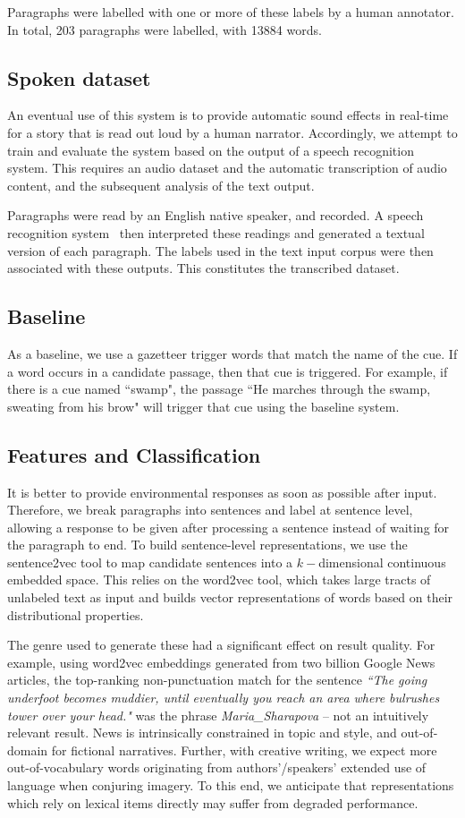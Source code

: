 \documentclass[10pt,a4paper]{article}
\begin{document}
Paragraphs were labelled with one or more of these labels by a human annotator.
In total, 203 paragraphs were labelled, with 13884 words.

\subsection{Spoken dataset}
An eventual use of this system is to provide automatic sound effects in real-time for a story that is read out loud by a human narrator.
Accordingly, we attempt to train and evaluate the system based on the output of a speech recognition system.
This requires an audio dataset and the automatic transcription of audio content, and the subsequent analysis of the text output.

Paragraphs were read by an English native speaker, and recorded.
A speech recognition system~\cite{lamere2003design} then interpreted these readings and generated a textual version of each paragraph.
The labels used in the text input corpus were then associated with these outputs.
This constitutes the transcribed dataset.

\subsection{Baseline}
As a baseline, we use a gazetteer trigger words that match the name of the cue.
If a word occurs in a candidate passage, then that cue is triggered.
For example, if there is a cue named ``swamp", the passage ``He marches through the swamp, sweating from his brow" will trigger that cue using the baseline system.

\subsection{Features and Classification}

It is better to provide environmental responses as soon as possible after input.
Therefore, we break paragraphs into sentences and label at sentence level, allowing a response to be given after processing a sentence instead of waiting for the paragraph to end.
To build sentence-level representations, we use the sentence2vec tool to map candidate sentences into a $k-$dimensional continuous embedded space.
This relies on the word2vec tool, which takes large tracts of unlabeled text as input and builds vector representations of words based on their distributional properties.

The genre used to generate these had a significant effect on result quality.
For example, using word2vec embeddings generated from two billion Google News articles, the top-ranking non-punctuation match for the sentence \emph{``The going underfoot becomes muddier, until eventually you reach an area where bulrushes tower over your head."} was the phrase {\em Maria\_Sharapova} -- not an intuitively relevant result.
News is intrinsically constrained in topic and style, and out-of-domain for fictional narratives.
Further, with creative writing, we expect more out-of-vocabulary words originating from authors'/speakers' extended use of language when conjuring imagery.
To this end, we anticipate that representations which rely on lexical items directly may suffer from degraded performance.
\end{document}
